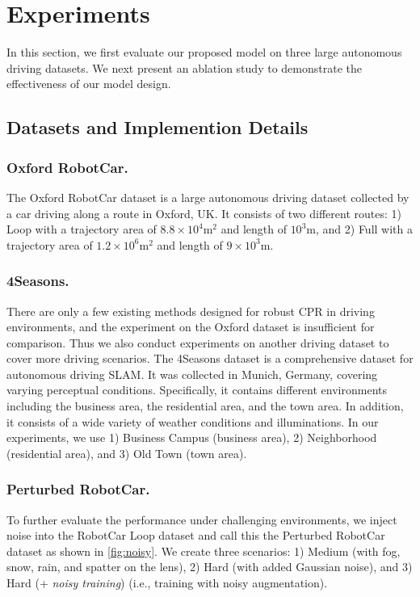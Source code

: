 \documentclass[letterpaper]{article} \usepackage{aaai23}  \usepackage{times}  \usepackage{helvet}  \usepackage{courier}  \usepackage[hyphens]{url}  \usepackage{graphicx} \urlstyle{rm} \def\UrlFont{\rm}  \usepackage{natbib}  \usepackage{caption} \frenchspacing  \setlength{\pdfpagewidth}{8.5in} \setlength{\pdfpageheight}{11in} \usepackage{booktabs}
\theoremstyle{remark}
\theoremstyle{plain}
\begin{document}
\section{Experiments}
In this section, we first evaluate our proposed model on three large autonomous driving datasets. We next present an ablation study to demonstrate the effectiveness of our model design.







\subsection{Datasets and Implemention Details}
\subsubsection{Oxford RobotCar.}
The Oxford RobotCar dataset\cite{robotcar} is a large autonomous driving dataset collected by a car driving along a route in Oxford, UK. It consists of two different routes: 1) Loop with a trajectory area of $8.8\times10^{4}\mathrm{m}^{2}$ and length of $10^{3}\mathrm{m}$,  and 2) Full with a trajectory area of $1.2\times10^{6}\mathrm{m}^{2}$ and length of $9\times10^{3}\mathrm{m}$.

\subsubsection{4Seasons.}
There are only a few existing methods designed for robust CPR in driving environments, and the experiment on the Oxford dataset is insufficient for comparison. Thus we also conduct experiments on another driving dataset to cover more driving scenarios. The 4Seasons dataset \cite{4seasons} is a comprehensive dataset for autonomous driving SLAM. It was collected in Munich, Germany, covering varying perceptual conditions. Specifically, it contains different environments including the business area, the residential area, and the town area. In addition, it consists of a wide variety of weather conditions and illuminations. In our experiments, we use 1) Business Campus (business area), 2) Neighborhood (residential area), and 3) Old Town (town area).

\subsubsection{Perturbed RobotCar.}
To further evaluate the performance under challenging environments, we inject noise into the RobotCar Loop dataset and call this the Perturbed RobotCar dataset as shown in \cref{fig:noisy}. We create three scenarios: 1) Medium (with fog, snow, rain, and spatter on the lens), 2) Hard (with added Gaussian noise), and 3) Hard (+ \emph{noisy training}) (i.e., training with noisy augmentation).
\end{document}
